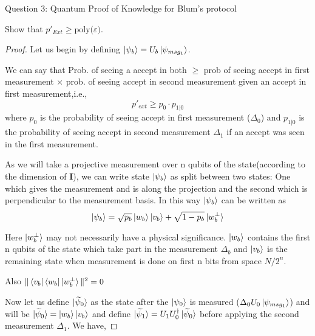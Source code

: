 \begin{solution}{Question 3: Quantum Proof of Knowledge for Blum’s protocol}\label{ques:x}
    \begin{question}
    Show that $p'_{Ext}\geq \text{poly($\varepsilon$)}$.
    \end{question}
    \tcblower{}
    \begin{proof}
    Let us begin by defining $\ket{\psi_b} = U_b\ket{\psi_{msg_1}}$.

    We can say that Prob. of seeing a accept in both $\geq$ prob of seeing accept in first measurement $\times$ prob. of seeing accept in second measurement given an accept in first measurement,i.e.,
    \[p'_{ext}\geq p_0\cdot p_{1|0}\]
    where $p_0$ is the probability of seeing accept in first measurement ($\Delta_0$) and $p_{1|0}$ is the probability of seeing accept in second measurement $\Delta_1$ if an accept was seen in the first measurement.\newline

    As we will take a projective measurement over n qubits of the state(according to the dimension of \textbf{I}), we can write state $\ket{\psi_b}$ as split between two states: One which gives the measurement and is along the projection and the second which is perpendicular to the measurement basis. In this way $\ket{\psi_b}$ can be written as 
    \begin{equation}
        \ket{\psi_b} = \sqrt{p_b}\ket{w_b}\ket{v_b} + \sqrt{1-p_b}\ket{w_b^\perp}
    \end{equation}

    Here $\ket{w_b^\perp}$ may not necessarily have a physical significance. $\ket{w_b}$ contains the first n qubits of the state which take part in the measurement $\Delta_b$ and $\ket{v_b}$ is the remaining state when measurement is done on first n bits from space $N/2^n$.

    Also $\|\bra{v_b}\bra{w_b}\ket{w_b^\perp}\|^2 =0$ 


    Now let us define $\ket{\widetilde{\psi}_0}$ as the state after the $\ket{\psi_0}$ is measured ($\Delta_0U_0\ket{\psi_{msg_1}}$) and will be $\ket{\widetilde{\psi}_0} = \ket{w_b}\ket{v_b}$ and define $\ket{\widetilde{\psi}_1} = U_1U_0^\dag\ket{\widetilde{\psi}_0}$ before applying the second measurement $\Delta_1$. We have,


\end{proof}
\end{solution}
